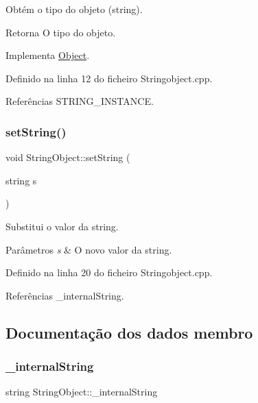 Obtém o tipo do objeto (string). 

\begin{DoxyReturn}{Retorna}
O tipo do objeto. 
\end{DoxyReturn}


Implementa \hyperlink{classObject_a08cee945bc224fc81f4448086625183d}{Object}.



Definido na linha 12 do ficheiro Stringobject.\+cpp.



Referências S\+T\+R\+I\+N\+G\+\_\+\+I\+N\+S\+T\+A\+N\+CE.

\mbox{\label{classStringObject_a96812d8ef025b1f897b09f816d0297f7}} 
\subsubsection{\texorpdfstring{set\+String()}{setString()}}
{\footnotesize\ttfamily void String\+Object\+::set\+String (\begin{DoxyParamCaption}\item[{string}]{s }\end{DoxyParamCaption})}



Substitui o valor da string. 


\begin{DoxyParams}{Parâmetros}
{\em s} & O novo valor da string. \\
\hline
\end{DoxyParams}


Definido na linha 20 do ficheiro Stringobject.\+cpp.



Referências \+\_\+internal\+String.



\subsection{Documentação dos dados membro}
\mbox{\label{classStringObject_a129b52ebca78da26c58175e45e1869cc}} 
\subsubsection{\texorpdfstring{\+\_\+internal\+String}{\_internalString}}
{\footnotesize\ttfamily string String\+Object\+::\+\_\+internal\+String\hspace{0.3cm}{\ttfamily [private]}}

